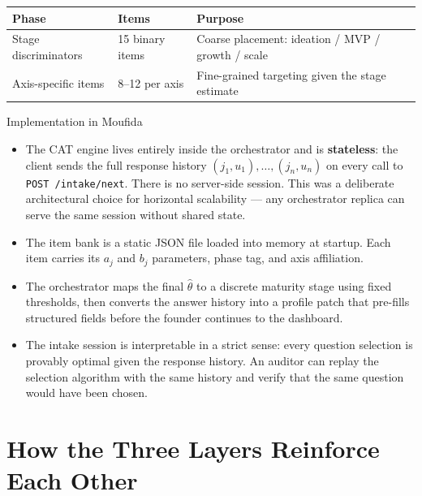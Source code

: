 \documentclass[11pt,a4paper]{article}
\begin{document}
\begin{center}\small
\begin{tabular}{@{}lll@{}}
\toprule
\textbf{Phase} & \textbf{Items} & \textbf{Purpose} \\
\midrule
Stage discriminators & 15 binary items & Coarse placement: ideation / MVP / growth / scale \\
Axis-specific items  & 8–12 per axis  & Fine-grained targeting given the stage estimate \\
\bottomrule
\end{tabular}
\end{center}

\begin{implbox}{Implementation in Moufida}
\begin{itemize}[leftmargin=1em]
  \item The CAT engine lives entirely inside the orchestrator and is \textbf{stateless}:
        the client sends the full response history $(j_1,u_1),\dots,(j_n,u_n)$ on every
        call to \texttt{POST /intake/next}. There is no server-side session. This was a
        deliberate architectural choice for horizontal scalability — any orchestrator
        replica can serve the same session without shared state.
  \item The item bank is a static JSON file loaded into memory at startup. Each item
        carries its $a_j$ and $b_j$ parameters, phase tag, and axis affiliation.
  \item The orchestrator maps the final $\hat{\theta}$ to a discrete maturity stage using
        fixed thresholds, then converts the answer history into a profile patch that
        pre-fills structured fields before the founder continues to the dashboard.
  \item The intake session is interpretable in a strict sense: every question selection
        is provably optimal given the response history. An auditor can replay the selection
        algorithm with the same history and verify that the same question would have been chosen.
\end{itemize}
\end{implbox}

\section{How the Three Layers Reinforce Each Other}
\end{document}
